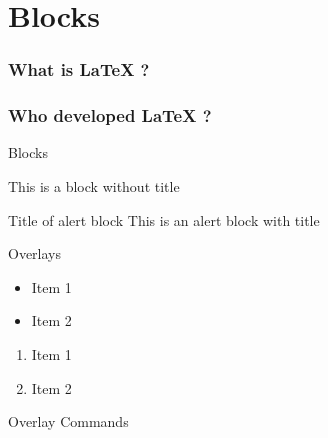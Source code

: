 \documentclass{beamer}
\begin{document}
    \section{Blocks}
    \begin{frame}
        \tableofcontents
    \end{frame}
    \begin{frame}
        \frametitle{What is LaTeX ?}
        \blindtext
    \end{frame}
    \begin{frame}
        \frametitle{Who developed LaTeX ?}
        \blindtext
    \end{frame}
    \begin{frame}{Blocks}
        \begin{exampleblock}{}
            This is a block without title
        \end{exampleblock}
        \begin{alertblock}{Title of alert block}
            This is an alert block with title
        \end{alertblock}
    \end{frame}
    \begin{frame}{Overlays}
        \begin{itemize}
            \item Item 1
            \pause
            \item Item 2
            \pause
        \end{itemize}
        \begin{enumerate}
            \item Item 1
            \pause
            \item Item 2
        \end{enumerate}
    \end{frame}
    \begin{frame}{Overlay Commands}
        
        
        
        
    \end{frame}
\end{document}
